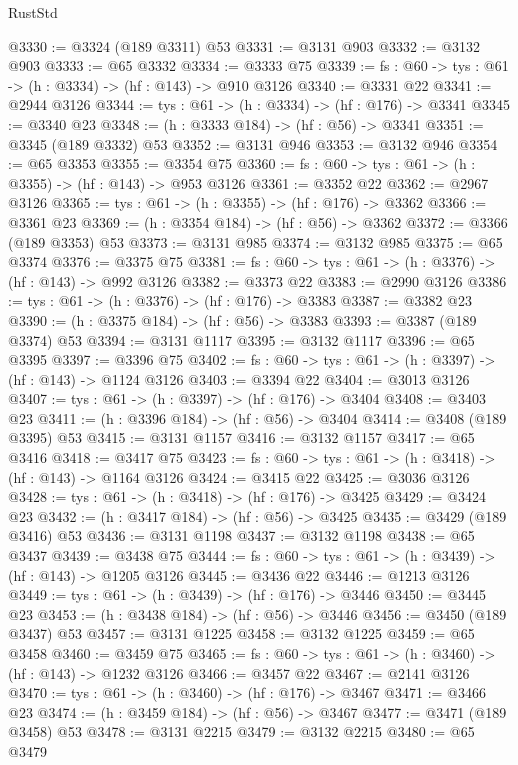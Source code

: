 \begin{lexlean}{RustStd}
\begin{coremodule}
@3330 := @3324 (@189 @3311) @53
@3331 := @3131 @903
@3332 := @3132 @903
@3333 := @65 @3332
@3334 := @3333 @75
@3339 := {fs : @60} -> {tys : @61} -> (h : @3334) -> (hf : @143) -> @910 @3126
@3340 := @3331 @22
@3341 := @2944 @3126
@3344 := {tys : @61} -> (h : @3334) -> (hf : @176) -> @3341
@3345 := @3340 @23
@3348 := (h : @3333 @184) -> (hf : @56) -> @3341
@3351 := @3345 (@189 @3332) @53
@3352 := @3131 @946
@3353 := @3132 @946
@3354 := @65 @3353
@3355 := @3354 @75
@3360 := {fs : @60} -> {tys : @61} -> (h : @3355) -> (hf : @143) -> @953 @3126
@3361 := @3352 @22
@3362 := @2967 @3126
@3365 := {tys : @61} -> (h : @3355) -> (hf : @176) -> @3362
@3366 := @3361 @23
@3369 := (h : @3354 @184) -> (hf : @56) -> @3362
@3372 := @3366 (@189 @3353) @53
@3373 := @3131 @985
@3374 := @3132 @985
@3375 := @65 @3374
@3376 := @3375 @75
@3381 := {fs : @60} -> {tys : @61} -> (h : @3376) -> (hf : @143) -> @992 @3126
@3382 := @3373 @22
@3383 := @2990 @3126
@3386 := {tys : @61} -> (h : @3376) -> (hf : @176) -> @3383
@3387 := @3382 @23
@3390 := (h : @3375 @184) -> (hf : @56) -> @3383
@3393 := @3387 (@189 @3374) @53
@3394 := @3131 @1117
@3395 := @3132 @1117
@3396 := @65 @3395
@3397 := @3396 @75
@3402 := {fs : @60} -> {tys : @61} -> (h : @3397) -> (hf : @143) -> @1124 @3126
@3403 := @3394 @22
@3404 := @3013 @3126
@3407 := {tys : @61} -> (h : @3397) -> (hf : @176) -> @3404
@3408 := @3403 @23
@3411 := (h : @3396 @184) -> (hf : @56) -> @3404
@3414 := @3408 (@189 @3395) @53
@3415 := @3131 @1157
@3416 := @3132 @1157
@3417 := @65 @3416
@3418 := @3417 @75
@3423 := {fs : @60} -> {tys : @61} -> (h : @3418) -> (hf : @143) -> @1164 @3126
@3424 := @3415 @22
@3425 := @3036 @3126
@3428 := {tys : @61} -> (h : @3418) -> (hf : @176) -> @3425
@3429 := @3424 @23
@3432 := (h : @3417 @184) -> (hf : @56) -> @3425
@3435 := @3429 (@189 @3416) @53
@3436 := @3131 @1198
@3437 := @3132 @1198
@3438 := @65 @3437
@3439 := @3438 @75
@3444 := {fs : @60} -> {tys : @61} -> (h : @3439) -> (hf : @143) -> @1205 @3126
@3445 := @3436 @22
@3446 := @1213 @3126
@3449 := {tys : @61} -> (h : @3439) -> (hf : @176) -> @3446
@3450 := @3445 @23
@3453 := (h : @3438 @184) -> (hf : @56) -> @3446
@3456 := @3450 (@189 @3437) @53
@3457 := @3131 @1225
@3458 := @3132 @1225
@3459 := @65 @3458
@3460 := @3459 @75
@3465 := {fs : @60} -> {tys : @61} -> (h : @3460) -> (hf : @143) -> @1232 @3126
@3466 := @3457 @22
@3467 := @2141 @3126
@3470 := {tys : @61} -> (h : @3460) -> (hf : @176) -> @3467
@3471 := @3466 @23
@3474 := (h : @3459 @184) -> (hf : @56) -> @3467
@3477 := @3471 (@189 @3458) @53
@3478 := @3131 @2215
@3479 := @3132 @2215
@3480 := @65 @3479

\end{coremodule}
\end{lexlean}
